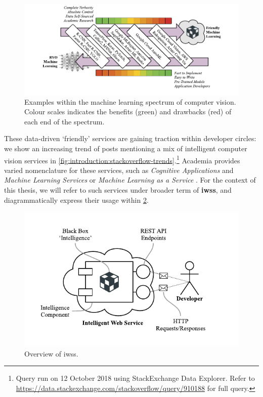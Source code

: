 \begin{figure}
\centering
\caption[The spectrum of machine learning]{Examples within the machine learning spectrum of computer vision. Colour scales indicates the benefits (green) and drawbacks (red) of each end of the spectrum.}
\label{fig:introduction:cv-spectrum}
\includegraphics[width=\linewidth]{cv-spectrum}
\end{figure}



These data-driven `friendly' services are gaining traction within developer circles: we show an increasing trend of  posts mentioning a mix of intelligent computer vision services in \cref{fig:introduction:stackoverflow-trends}.\footnote{Query run on 12 October 2018 using StackExchange Data Explorer. Refer to \url{https://data.stackexchange.com/stackoverflow/query/910188} for full query.}
Academia provides varied nomenclature for these services, such as \textit{Cognitive Applications} and \textit{Machine Learning Services} \citep{Hwang:2017tr} or \textit{Machine Learning as a Service} \citep{Ribeiro:2015dz}. 
For the context of this thesis, we will refer to such services under broader term of \textbf{\glspl{iws}}, and diagrammatically express their usage within \cref{fig:introduction:cloud-intelliegnce-service}.

\begin{figure}[h!]
\centering
\caption[Overview of intelligent web services]{Overview of \glspl{iws}.}
\label{fig:introduction:cloud-intelliegnce-service}
\includegraphics{cloud-intelliegnce-service}
\end{figure}



